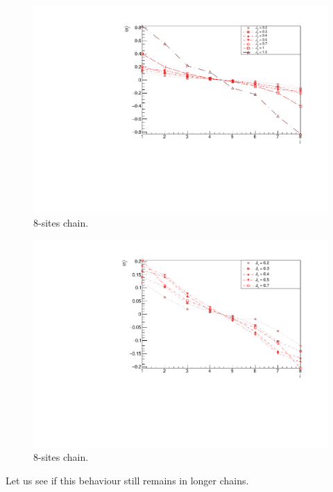 \begin{figure}[H]
    \centering
    \includegraphics[scale=0.7]{Figures/8sites_LMvsJz.pdf}
    \caption{8-sites chain.}
    \label{fig:my_label}
\end{figure}

\begin{figure}[H]
    \centering
    \includegraphics[scale=0.7]{Figures/8sites_LMvsLowJz.pdf}
    \caption{8-sites chain.}
    \label{fig:my_label}
\end{figure}


Let us see if this behaviour still remains in longer chains.

